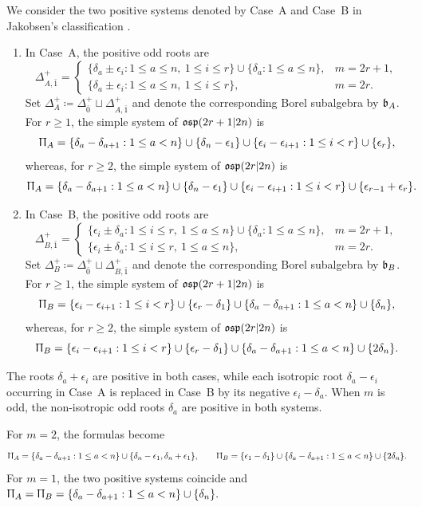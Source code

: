 \begin{example}
\label{ex::osp-systems} We consider the two positive systems denoted by Case~A and Case~B in Jakobsen's classification \cite{jakobsen1994full}.
\begin{enumerate}
\item[(a)] In Case~A, the positive odd roots are
\[
\Delta_{A,\bar1}^{+}
=
\begin{cases}
\{\delta_a\pm\epsilon_i:1\leq a\leq n,\ 1\leq i\leq r\}
 \cup\{\delta_a:1\leq a\leq n\},
&m=2r+1,\\
\{\delta_a\pm\epsilon_i:1\leq a\leq n,\ 1\leq i\leq r\},
&m=2r.
\end{cases}
\]
Set $\Delta_A^{+}\coloneqq\Delta_{\bar0}^{+}\sqcup\Delta_{A,\bar1}^{+}$ and denote the corresponding Borel subalgebra by ${\mathfrak b}_A$. For $r\geq1$, the simple system of ${\mathfrak{osp}}(2r+1\vert2n)$ is
\[
\Uppi_A
=
\{\delta_a-\delta_{a+1}:1\leq a<n\}
\cup\{\delta_n-\epsilon_1\}
\cup\{\epsilon_i-\epsilon_{i+1}:1\leq i<r\}
\cup\{\epsilon_r\},
\]
whereas, for $r\geq2$, the simple system of ${\mathfrak{osp}}(2r\vert2n)$ is
\[
\Uppi_A
=
\{\delta_a-\delta_{a+1}:1\leq a<n\}
\cup\{\delta_n-\epsilon_1\}
\cup\{\epsilon_i-\epsilon_{i+1}:1\leq i<r\}
\cup\{\epsilon_{r-1}+\epsilon_r\}.
\]

\item[(b)] In Case~B, the positive odd roots are
\[
\Delta_{B,\bar1}^{+}
=
\begin{cases}
\{\epsilon_i\pm\delta_a:1\leq i\leq r,\ 1\leq a\leq n\}
 \cup\{\delta_a:1\leq a\leq n\},
&m=2r+1,\\
\{\epsilon_i\pm\delta_a:1\leq i\leq r,\ 1\leq a\leq n\},
&m=2r.
\end{cases}
\]
Set $\Delta_B^{+}\coloneqq\Delta_{\bar0}^{+}\sqcup\Delta_{B,\bar1}^{+}$ and denote the corresponding Borel subalgebra by ${\mathfrak b}_B$. For $r\geq1$, the simple system of ${\mathfrak{osp}}(2r+1\vert2n)$ is
\[
\Uppi_B
=
\{\epsilon_i-\epsilon_{i+1}:1\leq i<r\}
\cup\{\epsilon_r-\delta_1\}
\cup\{\delta_a-\delta_{a+1}:1\leq a<n\}
\cup\{\delta_n\},
\]
whereas, for $r\geq2$, the simple system of ${\mathfrak{osp}}(2r\vert2n)$ is
\[
\Uppi_B
=
\{\epsilon_i-\epsilon_{i+1}:1\leq i<r\}
\cup\{\epsilon_r-\delta_1\}
\cup\{\delta_a-\delta_{a+1}:1\leq a<n\}
\cup\{2\delta_n\}.
\]
\end{enumerate}
The roots $\delta_a+\epsilon_i$ are positive in both cases, while each isotropic root $\delta_a-\epsilon_i$ occurring in Case~A is replaced in Case~B by its negative $\epsilon_i-\delta_a$. When $m$ is odd, the non-isotropic odd roots $\delta_a$ are positive in both systems.

For $m=2$, the formulas become
\[
\Uppi_A
=
\{\delta_a-\delta_{a+1}:1\leq a<n\}
\cup\{\delta_n-\epsilon_1,\delta_n+\epsilon_1\},
\qquad
\Uppi_B
=
\{\epsilon_1-\delta_1\}
\cup\{\delta_a-\delta_{a+1}:1\leq a<n\}
\cup\{2\delta_n\}.
\]
For $m=1$, the two positive systems coincide and
$
\Uppi_A=\Uppi_B
=
\{\delta_a-\delta_{a+1}:1\leq a<n\}
\cup\{\delta_n\}.
$ \end{example}

